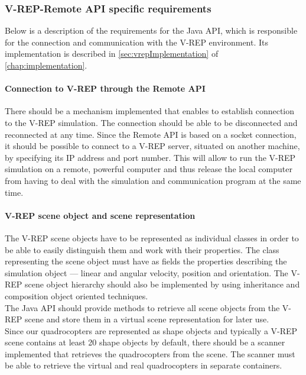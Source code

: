 \subsubsection{V-REP-Remote API specific requirements}
\label{sec:requirementsVREP}

Below is a description of the requirements for the Java API, which is responsible for the connection and communication with the V-REP environment. Its implementation is described in \ref{sec:vrepImplementation} of \ref{chap:implementation}.

\paragraph{Connection to V-REP through the Remote API}

There should be a mechanism  implemented  that enables to establish connection to the V-REP simulation. 
The connection should be able to be disconnected and reconnected at any time. 
Since the Remote API is based on a socket connection, it should be possible to connect to a V-REP server, situated on another machine, by specifying its IP address and port number. 
This will allow to run the V-REP simulation on a remote, powerful computer and thus release the local computer from having to deal with the simulation and communication program at the same time.

\paragraph{V-REP scene object and scene representation}\label{sceneobject}
The V-REP scene objects have to be represented as individual classes in order to be able to easily distinguish them and work with their properties. 
The class representing the scene object must have as fields the properties describing the simulation object --- linear and angular velocity, position and orientation. 
The V-REP scene object hierarchy should also be implemented by using inheritance and composition object oriented techniques. \\
The Java API should provide methods to retrieve all scene objects from the V-REP scene and store them in a virtual scene representation for later use.\\
Since our quadrocopters are represented as shape objects and typically a V-REP scene contains at least 20 shape objects by default, there should be a scanner implemented that retrieves the quadrocopters from the scene. 
The scanner must be able to retrieve the virtual and real quadrocopters in  separate containers.

